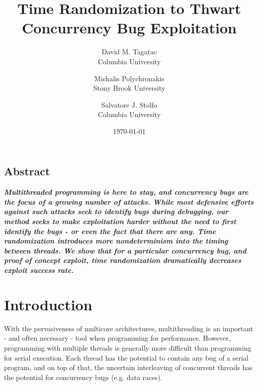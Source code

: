 \documentclass[letterpaper,twocolumn,10pt]{article}
\begin{document}
\date{\today}

\title{\Large \bf Time Randomization to Thwart Concurrency Bug Exploitation}

\author{
{\rm David M. Tagatac}\\
Columbia University
\and
{\rm Michalis Polychronakis}\\
Stony Brook University
\and
{\rm Salvatore J. Stolfo}\\
Columbia University
} %

\maketitle

\subsection*{Abstract}
\textbf{\textit{Multithreaded programming is here to stay, and concurrency bugs are the focus of a growing number of attacks.  While most defensive efforts against such attacks seek to identify bugs during debugging, our method seeks to make exploitation harder without the need to first identify the bugs - or even the fact that there are any.  Time randomization introduces more nondeterminism into the timing between threads.  We show that for a particular concurrency bug, and proof of concept exploit, time randomization dramatically decreases exploit success rate.}}

\section{Introduction}
With the pervasiveness of multicore architectures, multithreading is an important - and often necessary - tool when programming for performance.  However, programming with multiple threads is generally more difficult than programming for serial execution.  Each thread has the potential to contain any bug of a serial program, and on top of that, the uncertain interleaving of concurrent threads has the potential for concurrency bugs (e.g. data races).
\end{document}
